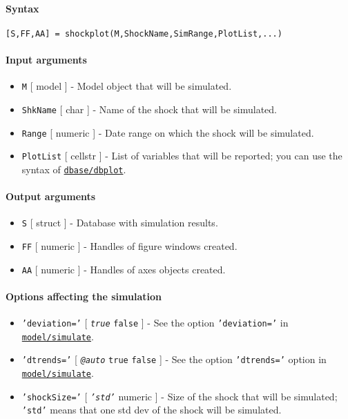 


	\paragraph{Syntax}

\begin{verbatim}
[S,FF,AA] = shockplot(M,ShockName,SimRange,PlotList,...)
\end{verbatim}

\paragraph{Input arguments}

\begin{itemize}
\item
  \texttt{M} {[} model {]} - Model object that will be simulated.
\item
  \texttt{ShkName} {[} char {]} - Name of the shock that will be
  simulated.
\item
  \texttt{Range} {[} numeric {]} - Date range on which the shock will be
  simulated.
\item
  \texttt{PlotList} {[} cellstr {]} - List of variables that will be
  reported; you can use the syntax of
  \href{dbase/dbplot}{\texttt{dbase/dbplot}}.
\end{itemize}

\paragraph{Output arguments}

\begin{itemize}
\item
  \texttt{S} {[} struct {]} - Database with simulation results.
\item
  \texttt{FF} {[} numeric {]} - Handles of figure windows created.
\item
  \texttt{AA} {[} numeric {]} - Handles of axes objects created.
\end{itemize}

\paragraph{Options affecting the
simulation}

\begin{itemize}
\item
  \texttt{'deviation='} {[} \emph{\texttt{true}} \textbar{}
  \texttt{false} {]} - See the option \texttt{'deviation='} in
  \href{model/simulate}{\texttt{model/simulate}}.
\item
  \texttt{'dtrends='} {[} \emph{\texttt{@auto}} \textbar{} \texttt{true}
  \textbar{} \texttt{false} {]} - See the option \texttt{'dtrends='}
  option in \href{model/simulate}{\texttt{model/simulate}}.
\item
  \texttt{'shockSize='} {[} \emph{\texttt{'std'}} \textbar{} numeric {]}
  - Size of the shock that will be simulated; \texttt{'std'} means that
  one std dev of the shock will be simulated.
\end{itemize}


